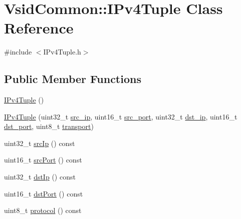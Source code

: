 \hypertarget{class_vsid_common_1_1_i_pv4_tuple}{\section{Vsid\-Common\-:\-:I\-Pv4\-Tuple Class Reference}
\label{class_vsid_common_1_1_i_pv4_tuple}
}


{\ttfamily \#include $<$I\-Pv4\-Tuple.\-h$>$}

\subsection*{Public Member Functions}
\begin{DoxyCompactItemize}
\item 
\hyperlink{class_vsid_common_1_1_i_pv4_tuple_a58885efc70336d03bf194818897bfde2}{I\-Pv4\-Tuple} ()
\item 
\hyperlink{class_vsid_common_1_1_i_pv4_tuple_aa2e749de3bddf1fe9fc31a334e2a11fe}{I\-Pv4\-Tuple} (uint32\-\_\-t \hyperlink{class_vsid_common_1_1_i_pv4_tuple_a2db76e768086b4ac0aabfed850940c76}{src\-\_\-ip}, uint16\-\_\-t \hyperlink{class_vsid_common_1_1_i_pv4_tuple_a68b8ec74e1abb0d15ba66c48837a1662}{src\-\_\-port}, uint32\-\_\-t \hyperlink{class_vsid_common_1_1_i_pv4_tuple_a21ace381c0b90771659095178d0f15af}{dst\-\_\-ip}, uint16\-\_\-t \hyperlink{class_vsid_common_1_1_i_pv4_tuple_a1c1d101406314b12ce43cc1d54177736}{dst\-\_\-port}, uint8\-\_\-t \hyperlink{class_vsid_common_1_1_i_pv4_tuple_a39c4c8ec9aaa3f80d17daaefb783beec}{transport})
\item 
uint32\-\_\-t \hyperlink{class_vsid_common_1_1_i_pv4_tuple_aa1f9b5071312e6062b5bd39ada560c43}{src\-Ip} () const 
\item 
uint16\-\_\-t \hyperlink{class_vsid_common_1_1_i_pv4_tuple_a4092c3bd8281c8f5a8972c5c6c6f4bac}{src\-Port} () const 
\item 
uint32\-\_\-t \hyperlink{class_vsid_common_1_1_i_pv4_tuple_a020b9a4b89155b0e4a796d3367e577eb}{dst\-Ip} () const 
\item 
uint16\-\_\-t \hyperlink{class_vsid_common_1_1_i_pv4_tuple_afc04d9dcf937c67ce60a2f2fcc0c7c10}{dst\-Port} () const 
\item 
uint8\-\_\-t \hyperlink{class_vsid_common_1_1_i_pv4_tuple_a6e05cf962bef53a9f3b1772a04e3878f}{protocol} () const 
\end{DoxyCompactItemize}
